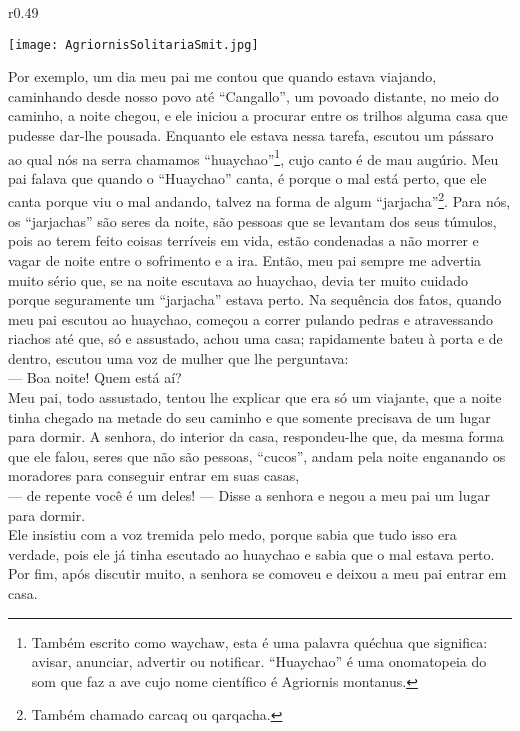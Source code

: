 \ifdefined\EnableIncludeImages
\begin{wrapfigure}{r}{0.49\textwidth}
  \begin{center}
  \vspace{-20pt}
    \texttt{[image: AgriornisSolitariaSmit.jpg]}
  \end{center}
  \vspace{-20pt}
\end{wrapfigure}
\fi
Por exemplo, um dia meu pai me contou que quando estava viajando, caminhando desde nosso povo até ``Cangallo'', um povoado distante, no meio do caminho, a noite chegou, e ele iniciou a procurar entre os trilhos alguma casa que pudesse dar-lhe pousada. Enquanto ele estava nessa tarefa, escutou um pássaro ao qual nós na serra chamamos ``huaychao''\footnote{Também escrito como waychaw, esta é uma palavra quéchua que significa: avisar, anunciar, advertir ou notificar. ``Huaychao'' é uma onomatopeia do som que faz a ave cujo nome científico é Agriornis montanus.}, cujo canto é de mau augúrio.
Meu pai falava que quando o ``Huaychao'' canta, é porque o mal está perto, que ele canta porque viu o mal andando, talvez na forma de algum ``jarjacha''\footnote{Também chamado carcaq ou qarqacha.}. 
Para nós, os ``jarjachas'' são seres da noite, são pessoas que se levantam dos seus túmulos, pois ao terem feito coisas terríveis em vida, estão condenadas a não morrer e vagar de noite entre o sofrimento e a ira. 
Então, meu pai sempre me advertia muito sério que, se na noite escutava ao huaychao, devia ter muito cuidado porque seguramente um ``jarjacha'' estava perto. 
Na sequência dos fatos, quando meu pai escutou ao huaychao, começou a correr pulando pedras e atravessando riachos até que, só e assustado, achou uma casa; rapidamente bateu à porta e de dentro, escutou uma voz de mulher que lhe perguntava:\\\indent
--- Boa noite! Quem está aí?\\\indent
Meu pai, todo assustado, tentou lhe explicar que era só um viajante, que a noite tinha chegado na metade do seu caminho e que somente precisava de um lugar para dormir. A senhora, do interior da casa, respondeu-lhe que, da mesma forma que ele falou, seres que não são pessoas, ``cucos'', andam pela noite enganando os moradores para conseguir entrar em suas casas,\\\indent
--- de repente você é um deles! --- Disse a senhora e negou a meu pai um lugar para dormir.\\\indent
Ele insistiu com a voz tremida pelo medo, porque sabia que tudo isso era verdade, pois ele já tinha escutado ao huaychao e sabia que o mal estava perto. Por fim, após discutir muito, a senhora se comoveu e deixou a meu pai entrar em casa. 

